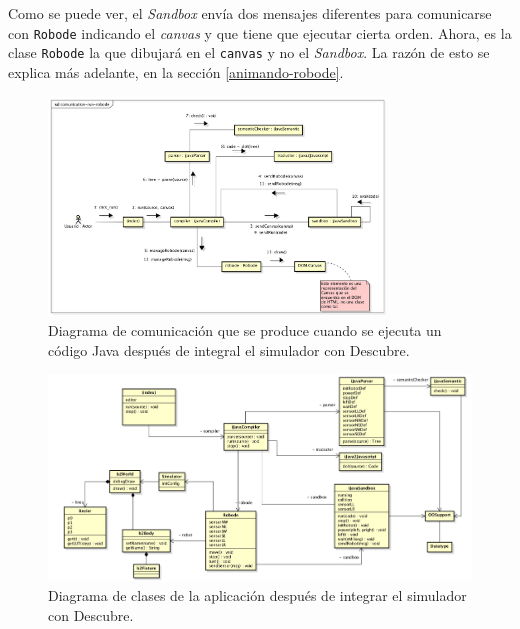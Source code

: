 Como se puede ver, el  \emph{Sandbox} envía dos mensajes diferentes para comunicarse con \texttt{Robode} indicando el \emph{canvas} y que tiene que ejecutar cierta orden. Ahora, es la clase \texttt{Robode} la que dibujará en el \texttt{canvas} y no el \emph{Sandbox}. La razón de esto se explica más adelante, en la sección \ref{animando-robode}.

\begin{figure}[!ht]
	\begin{centering}
		\includegraphics[width=0.8\textwidth]{images/comunication-run-robode.png}
			\caption{Diagrama de comunicación que se produce cuando se ejecuta un código Java después de integral el simulador con Descubre.}
				\label{fig:comunication-run-robode}
	\end{centering}
\end{figure}

\begin{figure}[!ht]
	\begin{centering}
		\includegraphics[width=1.2\textwidth]{images/diagram-ijava-robode.png}
			\caption{Diagrama de clases de la aplicación después de integrar el simulador con Descubre.}
				\label{fig:diagram-ijava-robode}
	\end{centering}
\end{figure}




